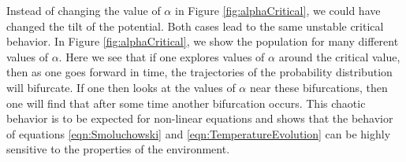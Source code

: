 Instead of changing the value of $\alpha$ in Figure \ref{fig:alphaCritical}, we could have changed the tilt of the potential. Both cases lead to the same unstable critical behavior. In Figure \ref{fig:alphaCritical}, we show the population for many different values of $\alpha$. Here we see that if one explores values of $\alpha$ around the critical value, then as one goes forward in time, the trajectories of the probability distribution will bifurcate. If one then looks at the values of $\alpha$ near these bifurcations, then one will find that after some time another bifurcation occurs. This chaotic behavior is to be expected for non-linear equations and shows that the behavior of equations \ref{eqn:Smoluchowski} and \ref{eqn:TemperatureEvolution} can be highly sensitive to the properties of the environment.   

